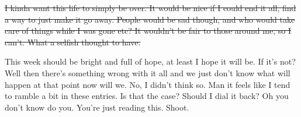 \st{I kinda want this life to simply be over. It would be nice if I could end it all,
find a way to just make it go away. People would be sad though, and who would take
care of things while I was gone etc? It wouldn't be fair to those around me, so I 
can't. What a selfish thought to have.}

This week should be bright and full of hope, at least I hope it will be. If it's not?
Well then there's something wrong with it all and we just don't know what will happen
at that point now will we. No, I didn't think so. Man it feels like I tend to ramble
a bit in these entries. Is that the case? Should I dial it back? Oh you don't know do
you. You're just reading this. Shoot.